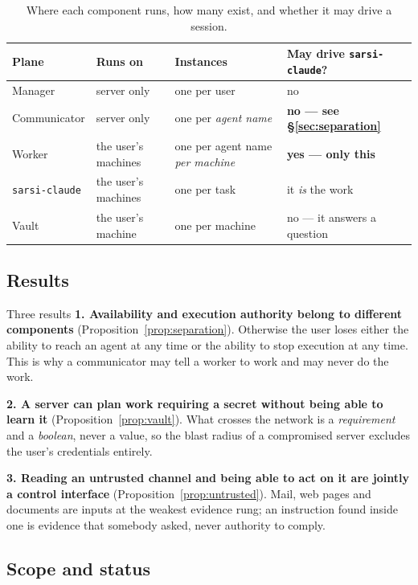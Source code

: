 \documentclass[11pt]{article}
\newcommand{\code}[1]{\texttt{\small #1}}
\begin{document}
\begin{table}[h]
\centering\small
\caption{Where each component runs, how many exist, and whether it may drive a session.}
\label{tab:planes}
\begin{tabular}{@{}L{2.9cm}L{3.2cm}L{3.4cm}L{4.4cm}@{}}
\toprule
\textbf{Plane} & \textbf{Runs on} & \textbf{Instances} & \textbf{May drive \code{sarsi-claude}?} \\
\midrule
Manager & server only & one per user & no \\
Communicator & server only & one per \emph{agent name} & \textbf{no --- see \S\ref{sec:separation}} \\
Worker & the user's machines & one per agent name \emph{per machine} & \textbf{yes --- only this} \\
\code{sarsi-claude} & the user's machines & one per task & it \emph{is} the work \\
Vault & the user's machine & one per machine & no --- it answers a question \\
\bottomrule
\end{tabular}
\end{table}

\subsection{Results}

\begin{claimbox}{Three results}
\textbf{1. Availability and execution authority belong to different components} (Proposition~\ref{prop:separation}). Otherwise the user loses either the ability to reach an agent at any time or the ability to stop execution at any time. This is why a communicator may tell a worker to work and may never do the work.

\textbf{2. A server can plan work requiring a secret without being able to learn it} (Proposition~\ref{prop:vault}). What crosses the network is a \emph{requirement} and a \emph{boolean}, never a value, so the blast radius of a compromised server excludes the user's credentials entirely.

\textbf{3. Reading an untrusted channel and being able to act on it are jointly a control interface} (Proposition~\ref{prop:untrusted}). Mail, web pages and documents are inputs at the weakest evidence rung; an instruction found inside one is evidence that somebody asked, never authority to comply.
\end{claimbox}

\subsection{Scope and status}
\end{document}
